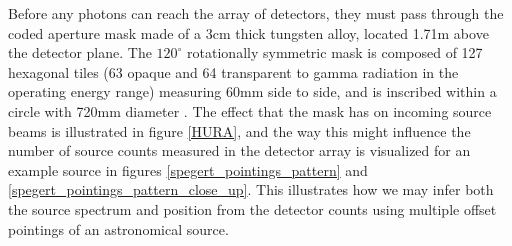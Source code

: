 \documentclass{report}
\begin{document}
Before any photons can reach the array of detectors, they must pass through the coded aperture mask made of a 3cm thick tungsten alloy, located 1.71m above the detector plane. The $120^\circ$ rotationally symmetric mask is composed of 127 hexagonal tiles (63 opaque and 64 transparent to gamma radiation in the operating energy range) measuring 60mm side to side, and is inscribed within a circle with 720mm diameter \cite{refId0}. The effect that the mask has on incoming source beams is illustrated in figure \ref{HURA}, and the way this might influence the number of source counts measured in the detector array is visualized for an example source in figures \ref{spegert_pointings_pattern} and \ref{spegert_pointings_pattern_close_up}. This illustrates how we may infer both the source spectrum and position from the detector counts using multiple offset pointings of an astronomical source.
\end{document}
